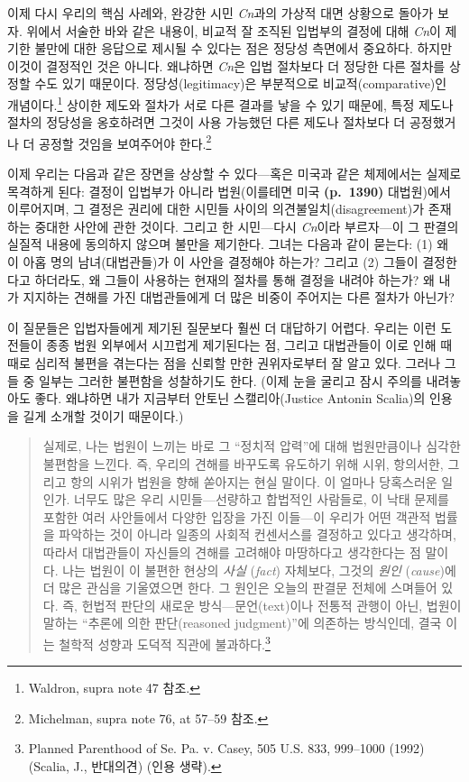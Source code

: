 \documentclass[a4paper,12pt,oneside]{article}  %
\newcommand{\emphksans}[1]{%
  {\kopubhangul\kopublatin\textsl{#1}}%
}
\begin{document}
이제 다시 우리의 핵심 사례와, 완강한 시민 \emph{Cn}과의 가상적 대면 상황으로
돌아가 보자. 위에서 서술한 바와 같은 내용이, 비교적 잘 조직된 입법부의
결정에 대해 \emph{Cn}이 제기한 불만에 대한 응답으로 제시될 수 있다는 점은
정당성 측면에서 중요하다. 하지만 이것이 결정적인 것은 아니다. 왜냐하면
\emph{Cn}은 입법 절차보다 더 정당한 다른 절차를 상정할 수도 있기 때문이다.
정당성(legitimacy)은 부분적으로 비교적(comparative)인
개념이다.\footnote{Waldron, supra note 47 참조.} 상이한 제도와 절차가
서로 다른 결과를 낳을 수 있기 때문에, 특정 제도나 절차의 정당성을
옹호하려면 그것이 사용 가능했던 다른 제도나 절차보다 더 공정했거나 더
공정할 것임을 보여주어야 한다.\footnote{Michelman, supra note 76, at
  57--59 참조.}

이제 우리는 다음과 같은 장면을 상상할 수 있다---혹은 미국과 같은
체제에서는 실제로 목격하게 된다: 결정이 입법부가 아니라 법원(이를테면
미국 \textbf{(p.~1390)} 대법원)에서 이루어지며, 그 결정은 권리에 대한
시민들 사이의 의견불일치(disagreement)가 존재하는 중대한 사안에 관한
것이다. 그리고 한 시민---다시 \emph{Cn}이라 부르자---이 그 판결의 실질적 내용에
동의하지 않으며 불만을 제기한다. 그녀는 다음과 같이 묻는다: (1) 왜 이
아홉 명의 남녀(대법관들)가 이 사안을 결정해야 하는가? 그리고 (2) 그들이
결정한다고 하더라도, 왜 그들이 사용하는 현재의 절차를 통해 결정을 내려야
하는가? 왜 내가 지지하는 견해를 가진 대법관들에게 더 많은 비중이
주어지는 다른 절차가 아닌가?

이 질문들은 입법자들에게 제기된 질문보다 훨씬 더 대답하기 어렵다. 우리는
이런 도전들이 종종 법원 외부에서 시끄럽게 제기된다는 점, 그리고
대법관들이 이로 인해 때때로 심리적 불편을 겪는다는 점을 신뢰할 만한
권위자로부터 잘 알고 있다. 그러나 그들 중 일부는 그러한 불편함을
성찰하기도 한다. (이제 눈을 굴리고 잠시 주의를 내려놓아도 좋다. 왜냐하면
내가 지금부터 안토닌 스캘리아(Justice Antonin Scalia)의 인용을 길게
소개할 것이기 때문이다.)

\begin{quote}
실제로, 나는 법원이 느끼는 바로 그 ``정치적 압력''에 대해 법원만큼이나
심각한 불편함을 느낀다. 즉, 우리의 견해를 바꾸도록 유도하기 위해 시위,
항의서한, 그리고 항의 시위가 법원을 향해 쏟아지는 현실 말이다. 이 얼마나
당혹스러운 일인가. 너무도 많은 우리 시민들---선량하고 합법적인 사람들로,
이 낙태 문제를 포함한 여러 사안들에서 다양한 입장을 가진 이들---이
우리가 어떤 객관적 법률을 파악하는 것이 아니라 일종의 사회적 컨센서스를
결정하고 있다고 생각하며, 따라서 대법관들이 자신들의 견해를 고려해야
마땅하다고 생각한다는 점 말이다. 나는 법원이 이 불편한 현상의
\emphksans{사실}(\emph{fact}) 자체보다, 그것의 \emphksans{원인}(\emph{cause})에 더 많은 관심을
기울였으면 한다. 그 원인은 오늘의 판결문 전체에 스며들어 있다. 즉,
헌법적 판단의 새로운 방식---문언(text)이나 전통적 관행이 아닌, 법원이
말하는 ``추론에 의한 판단(reasoned judgment)''에 의존하는 방식인데, 결국
이는 철학적 성향과 도덕적 직관에 불과하다.\footnote{Planned Parenthood
  of Se. Pa. v. Casey, 505 U.S. 833, 999--1000 (1992) (Scalia, J.,
  반대의견) (인용 생략).}
\end{quote}
\end{document}
